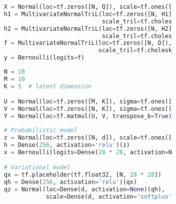 \documentclass{article} %
\begin{document}
\begin{figure}[t]
\begin{subfigure}{1.0\columnwidth}
  \centering
\begin{lstlisting}[language=python]
X = Normal(loc=tf.zeros([N, Q]), scale=tf.ones([N, Q]))
h1 = MultivariateNormalTriL(loc=tf.zeros([N, H1]),
                            scale_tril=tf.cholesky(rbf(X)))
h2 = MultivariateNormalTriL(loc=tf.zeros([N, H2]),
                            scale_tril=tf.cholesky(rbf(h1)))
f = MultivariateNormalTriL(loc=tf.zeros([N, D]),
                           scale_tril=tf.cholesky(rbf(h2)))
y = Bernoulli(logits=f)
\end{lstlisting}
\end{subfigure}%
%   
\caption{}
\end{figure}

\begin{figure}[t]
\begin{subfigure}{0.3\columnwidth}
  \centering
  
\end{subfigure}%
\begin{subfigure}{0.7\columnwidth}
\begin{lstlisting}[language=python]
N = 10
M = 10
K = 5  # latent dimension

U = Normal(loc=tf.zeros([M, K]), sigma=tf.ones([M, K]))
V = Normal(loc=tf.zeros([N, K]), sigma=tf.ones([N, K]))
Y = Normal(loc=tf.matmul(U, V, transpose_b=True), sigma=tf.ones([N, M]))
\end{lstlisting}
\end{subfigure}
\caption{}
\end{figure}

\begin{figure}[t]
\begin{subfigure}{0.225\columnwidth}
  \centering
  
\end{subfigure}%
\begin{subfigure}{0.65\columnwidth}
  \centering
\begin{lstlisting}[language=python]
# Probabilistic model
z = Normal(loc=tf.zeros([N, d]), scale=tf.ones([N, d]))
h = Dense(256, activation='relu')(z)
x = Bernoulli(logits=Dense(28 * 28, activation=None)(h))

# Variational model
qx = tf.placeholder(tf.float32, [N, 28 * 28])
qh = Dense(256, activation='relu')(qx)
qz = Normal(loc=Dense(d, activation=None)(qh),
            scale=Dense(d, activation='softplus')(qh))
\end{lstlisting}
\end{subfigure}
\caption{}
\end{figure}
\end{document}
